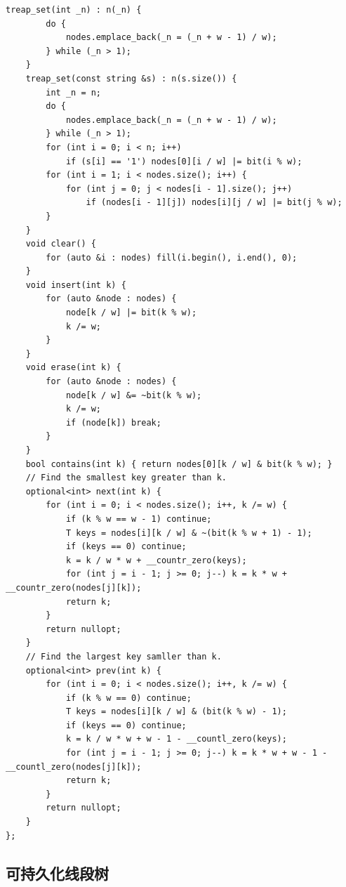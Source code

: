\documentclass[UTF8, twoside]{ctexart}
\begin{document}
\begin{sloppypar}
\begin{lstlisting}[style=cpp]
    treap_set(int _n) : n(_n) {
        do {
            nodes.emplace_back(_n = (_n + w - 1) / w);
        } while (_n > 1);
    }
    treap_set(const string &s) : n(s.size()) {
        int _n = n;
        do {
            nodes.emplace_back(_n = (_n + w - 1) / w);
        } while (_n > 1);
        for (int i = 0; i < n; i++)
            if (s[i] == '1') nodes[0][i / w] |= bit(i % w);
        for (int i = 1; i < nodes.size(); i++) {
            for (int j = 0; j < nodes[i - 1].size(); j++)
                if (nodes[i - 1][j]) nodes[i][j / w] |= bit(j % w);
        }
    }
    void clear() {
        for (auto &i : nodes) fill(i.begin(), i.end(), 0);
    }
    void insert(int k) {
        for (auto &node : nodes) {
            node[k / w] |= bit(k % w);
            k /= w;
        }
    }
    void erase(int k) {
        for (auto &node : nodes) {
            node[k / w] &= ~bit(k % w);
            k /= w;
            if (node[k]) break;
        }
    }
    bool contains(int k) { return nodes[0][k / w] & bit(k % w); }
    // Find the smallest key greater than k.
    optional<int> next(int k) {
        for (int i = 0; i < nodes.size(); i++, k /= w) {
            if (k % w == w - 1) continue;
            T keys = nodes[i][k / w] & ~(bit(k % w + 1) - 1);
            if (keys == 0) continue;
            k = k / w * w + __countr_zero(keys);
            for (int j = i - 1; j >= 0; j--) k = k * w + __countr_zero(nodes[j][k]);
            return k;
        }
        return nullopt;
    }
    // Find the largest key samller than k.
    optional<int> prev(int k) {
        for (int i = 0; i < nodes.size(); i++, k /= w) {
            if (k % w == 0) continue;
            T keys = nodes[i][k / w] & (bit(k % w) - 1);
            if (keys == 0) continue;
            k = k / w * w + w - 1 - __countl_zero(keys);
            for (int j = i - 1; j >= 0; j--) k = k * w + w - 1 - __countl_zero(nodes[j][k]);
            return k;
        }
        return nullopt;
    }
};
\end{lstlisting}

\subsection{可持久化线段树}


\end{sloppypar}
\end{document}
